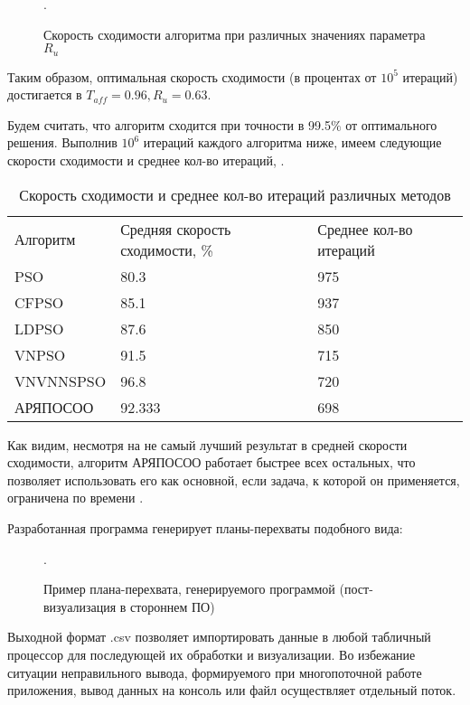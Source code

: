 \begin{figure*}[h!]
	\caption{Скорость сходимости алгоритма при различных значениях параметра $R_{u}$}.
\end{figure*} 

\newpage

Таким образом, оптимальная скорость сходимости (в процентах от $10^5$ итераций) достигается  в $T_{aff} = 0.96, R_{u} = 0.63$.

Будем считать, что алгоритм сходится  при точности в 99.5$\%$ от оптимального решения. Выполнив $10^6$ итераций каждого алгоритма ниже, имеем следующие скорости сходимости и среднее кол-во итераций, \cite[с. 521]{Cheng:2017}.


\begin{table}[]
	\begin{tabular}{lll}
		Алгоритм  & Средняя скорость сходимости, \% & Среднее кол-во итераций \\
		PSO       & 80.3                    & 975                     \\
		CFPSO     & 85.1                    & 937                     \\
		LDPSO     & 87.6                    & 850                     \\
		VNPSO     & 91.5                    & 715                     \\
		VNVNNSPSO & 96.8                    & 720                     \\
		АРЯПОСОО  & 92.333                  & 698                    
	\end{tabular}
	\caption{Скорость сходимости и среднее кол-во итераций различных методов}
	\label{tab:converg_rate_and_avg_iters_number}
\end{table}

Как видим, несмотря на не самый лучший результат в средней скорости сходимости, алгоритм АРЯПОСОО работает быстрее всех остальных, что позволяет использовать его как основной, если задача, к которой он применяется, ограничена по времени \cite[с. 522-524]{Cheng:2017}. 

Разработанная  программа генерирует планы-перехваты подобного вида:



\begin{figure*}[]
	\caption{Пример плана-перехвата, генерируемого программой (пост-визуализация в стороннем ПО)}.
\end{figure*} 

\newpage

Выходной формат .csv позволяет импортировать данные в любой табличный процессор для последующей их обработки и визуализации. Во избежание ситуации неправильного вывода, формируемого при многопоточной работе приложения, вывод данных на консоль или файл осуществляет отдельный поток.
